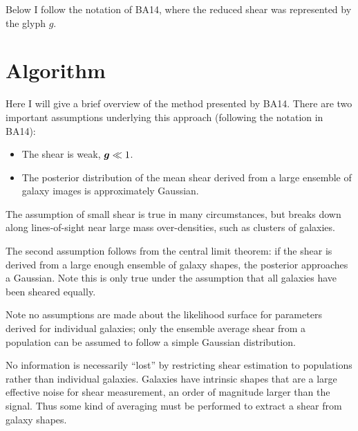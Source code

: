 \documentclass[usegraphicx,usenatbib]{mn2e}
\newcommand{\vecg}{\mbox{\boldmath $g$}}
\begin{document}
Below I follow the notation of BA14, where the reduced shear was represented by
the glyph \vecg.

\section{Algorithm} \label{sec:algo}

Here I will give a brief overview of the method presented by BA14.  There are
two important assumptions underlying this approach (following the notation in
BA14):

\begin{itemize}

    \item The shear is weak, $\vecg \ll 1$.

    \item The posterior distribution of the mean shear derived from a large
        ensemble of galaxy images is approximately Gaussian.

\end{itemize}

The assumption of small shear is true in many circumstances, but breaks down
along lines-of-sight near large mass over-densities, such as clusters of
galaxies.

The second assumption follows from the central limit theorem: if the shear is
derived from a large enough ensemble of galaxy shapes, the posterior approaches
a Gaussian.  Note this is only true under the assumption that all
galaxies have been sheared equally.

Note no assumptions are made about the likelihood surface for parameters
derived for individual galaxies; only the ensemble average shear from a
population can be assumed to follow a simple Gaussian distribution.

No information is necessarily ``lost'' by restricting shear estimation to
populations rather than individual galaxies.  Galaxies have intrinsic shapes
that are a large effective noise for shear measurement, an order of magnitude
larger than the signal.  Thus some kind of averaging must be performed to
extract a shear from galaxy shapes.  
\end{document}
